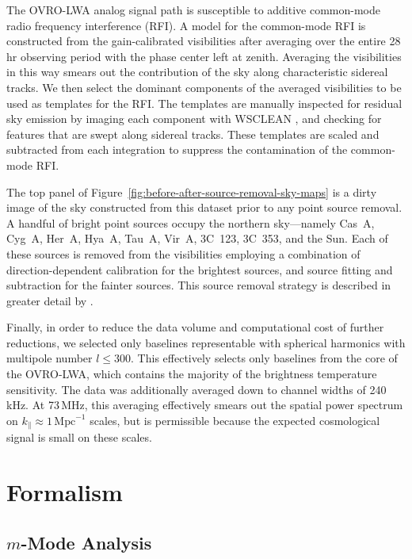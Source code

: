 \documentclass[twocolumn]{aastex62}
\begin{document}
The OVRO-LWA analog signal path is susceptible to additive common-mode radio frequency interference
(RFI). A model for the common-mode RFI is constructed from the gain-calibrated visibilities after
averaging over the entire 28\,hr observing period with the phase center left at zenith. Averaging
the visibilities in this way smears out the contribution of the sky along characteristic sidereal
tracks. We then select the dominant components of the averaged visibilities to be used as templates
for the RFI. The templates are manually inspected for residual sky emission by imaging each
component with WSCLEAN \citep{2014MNRAS.444..606O}, and checking for features that are swept along
sidereal tracks. These templates are scaled and subtracted from each integration to suppress the
contamination of the common-mode RFI.

The top panel of Figure~\ref{fig:before-after-source-removal-sky-maps} is a dirty image of the sky
constructed from this dataset prior to any point source removal.  A handful of bright point sources
occupy the northern sky---namely Cas~A, Cyg~A, Her~A, Hya~A, Tau~A, Vir~A, 3C~123, 3C~353, and the
Sun.  Each of these sources is removed from the visibilities employing a combination of
direction-dependent calibration for the brightest sources, and source fitting and subtraction for
the fainter sources. This source removal strategy is described in greater detail by
\citet{2018AJ....156...32E}.

Finally, in order to reduce the data volume and computational cost of further reductions, we
selected only baselines representable with spherical harmonics with multipole number $l \le 300$.
This effectively selects only baselines from the core of the OVRO-LWA, which contains the majority
of the brightness temperature sensitivity. The data was additionally averaged down to channel widths
of 240\,kHz. At 73\,MHz, this averaging effectively smears out the spatial power spectrum on
$k_\parallel \approx 1\,\text{Mpc}^{-1}$ scales, but is permissible because the expected
cosmological signal is small on these scales.

\section{Formalism}\label{sec:formalism}

\subsection{$m$-Mode Analysis}
\end{document}
